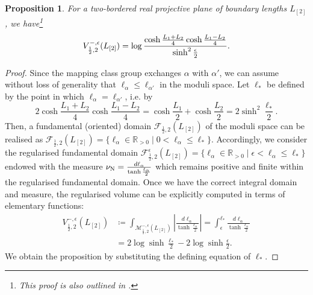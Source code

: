 \documentclass[12pt]{amsart}
\theoremstyle{plain}
\newtheorem{proposition}[theorem]{Proposition}
\theoremstyle{definition}
\theoremstyle{remark}
\numberwithin{equation}{section}
\begin{document}

\begin{proposition}\label{prop:V_{1/2,2}}
For a two-bordered real projective plane of boundary lengths $L_{[2]}$, we have\footnote{This proof is also outlined in \cite{Sta23}.}
\begin{equation}\label{V_{1/2,2}-1}
V^{-,\epsilon}_{\frac12,2}(L_{[2]})=\log\frac{\cosh\frac{L_1+L_2}{4}\cosh\frac{L_1-L_2}{4}}{\sinh^2\frac{\epsilon}{2}}.
\end{equation}
\end{proposition}
\begin{proof}
Since the mapping class group exchanges $\alpha$ with $\alpha'$, we can assume without loss of generality that $\ell_\alpha\leq\ell_{\alpha'}$ in the moduli space. Let $\ell_*$ be defined by the point in which $\ell_\alpha=\ell_{\alpha'}$, i.e. by
\begin{equation*}
    2\cosh\frac{L_1+L_2}{4}\cosh\frac{L_1-L_2}{4}=\cosh\frac{L_1}{2}+\cosh\frac{L_2}{2}=2\sinh^2\frac{\ell_*}{2}.
\end{equation*}
Then, a fundamental (oriented) domain $\mathcal{F}_{\frac12,2}(L_{[2]})$ of the moduli space can be realised as $\mathcal{F}_{\frac12,2}(L_{[2]})=\{\ell_\alpha\in\mathbb{R}_{>0}\mid 0<\ell_\alpha\leq\ell_*\}$. Accordingly, we consider the regularised fundamental domain $\mathcal{F}_{\frac12,2}^\epsilon(L_{[2]})=\{\ell_\alpha\in\mathbb{R}_{>0}\mid\epsilon<\ell_\alpha\leq\ell_*\}$ endowed with the measure $\nu_{{\rm N}}=\frac{d\ell_\alpha}{\tanh\frac{\ell_\alpha}{2}}$ which remains positive and finite within the regularised fundamental domain. Once we have the correct integral domain and measure, the regularised volume can be explicitly computed in terms of elementary functions: 
\begin{align}
V^{-,\epsilon}_{\frac12,2}(L_{[2]}) & \coloneqq\int_{\mathcal{M}_{\frac12,2}^{-,\epsilon}(L_{[2]})}\left|\frac{d\ell_\alpha}{\tanh\frac{\ell_\alpha}{2}}\right|=\int_\epsilon^{\ell_*}\frac{d\ell_\alpha}{\tanh\frac{\ell_\alpha}{2}}\nonumber \\
&=2\log\sinh\frac{\ell_*}{2}-2\log\sinh\frac{\epsilon}{2}.\nonumber
\end{align}
We obtain the proposition by substituting the defining equation of $\ell_*$.
\end{proof}
\end{document}
